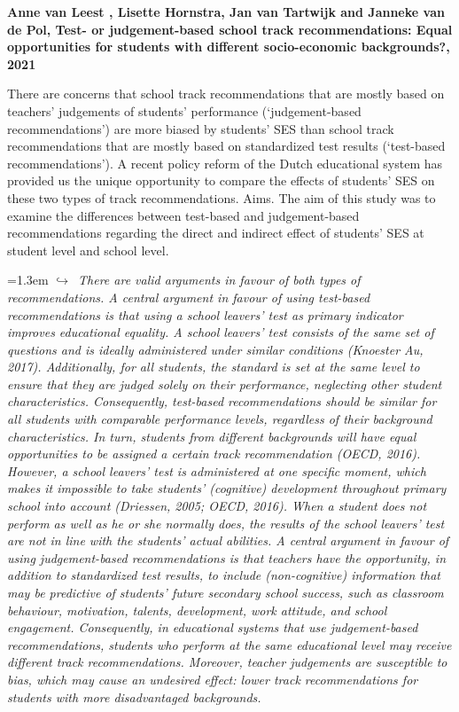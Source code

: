 \documentclass[11pt]{article}
\newcommand{\entry}[3]{%
  \par\medskip\noindent\textbf{#1}\par
  \nopagebreak #2\hspace{0.35em}{\small\color{tagcol}[#3]}\par}
\newcommand{\note}[1]{\par\smallskip\noindent\hangindent=1.3em
  \textcolor{notecol}{\footnotesize$\hookrightarrow$~\textit{#1}}}
\begin{document}
\entry{Anne van Leest , Lisette Hornstra, Jan van Tartwijk and Janneke van de Pol, Test- or judgement-based school track recommendations: Equal opportunities for students with different socio-economic backgrounds?, 2021 }{There are concerns that school track recommendations that are mostly based on teachers’ judgements of students’ performance (‘judgement-based recommendations’) are more biased by students’ SES than school track recommendations that are mostly based on standardized test results (‘test-based recommendations’). A recent policy reform of the Dutch educational system has provided us the unique opportunity to compare the effects of students’ SES on these two types of track recommendations.  Aims. The aim of this study was to examine the differences between test-based and judgement-based recommendations regarding the direct and indirect effect of students’ SES at student level and school level.}{rt}
\note{There are valid arguments in favour of both types of recommendations. A central argument in favour of using test-based recommendations is that using a school leavers’ test as primary indicator improves educational equality. A school leavers’ test consists of the same set of questions and is ideally administered under similar conditions (Knoester Au, 2017). Additionally, for all students, the standard is set at the same level to ensure that they are judged solely on their performance, neglecting other student characteristics. Consequently, test-based recommendations should be similar for all students with comparable performance levels, regardless of their background characteristics. In turn, students from different backgrounds will have equal opportunities to be assigned a certain track recommendation (OECD, 2016). However, a school leavers’ test is administered at one specific moment, which makes it impossible to take students’ (cognitive) development throughout primary school into account (Driessen, 2005; OECD, 2016). When a student does not perform as well as he or she normally does, the results of the school leavers’ test are not in line with the students’ actual abilities. A central argument in favour of using judgement-based recommendations is that teachers have the opportunity, in addition to standardized test results, to include (non-cognitive) information that may be predictive of students’ future secondary school success, such as classroom behaviour, motivation, talents, development, work attitude, and school engagement. Consequently, in educational systems that use judgement-based recommendations, students who perform at the same educational level may receive different track recommendations. Moreover, teacher judgements are susceptible to bias, which may cause an undesired effect: lower track recommendations for students with more disadvantaged backgrounds.
}
\end{document}
